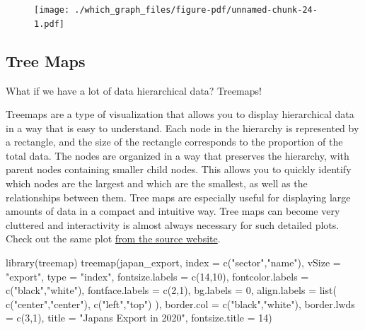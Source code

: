 \documentclass[
  letterpaper,
]{book}
\newenvironment{Shaded}{\begin{snugshade}}{\end{snugshade}}
\newcommand{\AttributeTok}[1]{\textcolor[rgb]{0.40,0.45,0.13}{#1}}
\newcommand{\DecValTok}[1]{\textcolor[rgb]{0.68,0.00,0.00}{#1}}
\newcommand{\FunctionTok}[1]{\textcolor[rgb]{0.28,0.35,0.67}{#1}}
\newcommand{\NormalTok}[1]{\textcolor[rgb]{0.00,0.23,0.31}{#1}}
\newcommand{\StringTok}[1]{\textcolor[rgb]{0.13,0.47,0.30}{#1}}
\begin{document}
\begin{figure}[H]

{\centering \texttt{[image: ./which\_graph\_files/figure-pdf/unnamed-chunk-24-1.pdf]}

}

\end{figure}

\hypertarget{tree-maps}{%
\subsection{Tree Maps}\label{tree-maps}}

What if we have a lot of data hierarchical data? Treemaps!

Treemaps are a type of visualization that allows you to display
hierarchical data in a way that is easy to understand. Each node in the
hierarchy is represented by a rectangle, and the size of the rectangle
corresponds to the proportion of the total data. The nodes are organized
in a way that preserves the hierarchy, with parent nodes containing
smaller child nodes. This allows you to quickly identify which nodes are
the largest and which are the smallest, as well as the relationships
between them. Tree maps are especially useful for displaying large
amounts of data in a compact and intuitive way. Tree maps can become
very cluttered and interactivity is almost always necessary for such
detailed plots. Check out the same plot
\href{https://atlas.cid.harvard.edu/countries/114/export-basket}{from
the source website}.

\begin{Shaded}
\begin{Highlighting}[]
\FunctionTok{library}\NormalTok{(treemap)}
\FunctionTok{treemap}\NormalTok{(japan\_export,}
        \AttributeTok{index =} \FunctionTok{c}\NormalTok{(}\StringTok{"sector"}\NormalTok{,}\StringTok{"name"}\NormalTok{),}
        \AttributeTok{vSize =} \StringTok{"export"}\NormalTok{,}
        \AttributeTok{type =} \StringTok{"index"}\NormalTok{,}
        \AttributeTok{fontsize.labels =} \FunctionTok{c}\NormalTok{(}\DecValTok{14}\NormalTok{,}\DecValTok{10}\NormalTok{),}
        \AttributeTok{fontcolor.labels =} \FunctionTok{c}\NormalTok{(}\StringTok{"black"}\NormalTok{,}\StringTok{"white"}\NormalTok{),}
        \AttributeTok{fontface.labels =} \FunctionTok{c}\NormalTok{(}\DecValTok{2}\NormalTok{,}\DecValTok{1}\NormalTok{),}
        \AttributeTok{bg.labels =} \DecValTok{0}\NormalTok{,}
        \AttributeTok{align.labels =} \FunctionTok{list}\NormalTok{(}
          \FunctionTok{c}\NormalTok{(}\StringTok{"center"}\NormalTok{,}\StringTok{"center"}\NormalTok{),}
          \FunctionTok{c}\NormalTok{(}\StringTok{"left"}\NormalTok{,}\StringTok{"top"}\NormalTok{)}
\NormalTok{        ),}
        \AttributeTok{border.col =} \FunctionTok{c}\NormalTok{(}\StringTok{"black"}\NormalTok{,}\StringTok{"white"}\NormalTok{),}
        \AttributeTok{border.lwds =} \FunctionTok{c}\NormalTok{(}\DecValTok{3}\NormalTok{,}\DecValTok{1}\NormalTok{),}
        \AttributeTok{title =} \StringTok{"Japans Export in 2020"}\NormalTok{,}
        \AttributeTok{fontsize.title =} \DecValTok{14}\NormalTok{)}
\end{Highlighting}
\end{Shaded}
\end{document}
